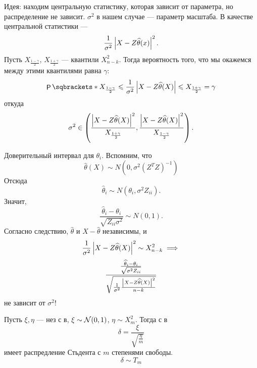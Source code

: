 Идея: находим центральную статистику, которая зависит от параметра, но распределение не зависит. \(\sigma^2\) в нашем случае --- параметр масштаба. В качестве центральной статистики --- 
\begin{displaymath}
    \frac{1}{\sigma^2} \left|X - Z \widehat{\theta}(x)\right|^2.
\end{displaymath}
Пусть \(X_{\frac{1 - \gamma}{2}}\), \(X_{\frac{1 + \gamma}{2}}\) --- квантили \(X^2_{n - k}\). Тогда вероятность того, что мы окажемся между этими квантилями равна \(\gamma\):
\begin{displaymath}
    \PP{X_{\frac{1 - \gamma}{2}} \leq \frac{1}{\sigma^2} \abs{X - Z \widehat\theta (X)} \leq X_{\frac{1 + \gamma}{2}}} = \gamma
\end{displaymath}
откуда
\begin{displaymath}
    \sigma^2 \in \left(\frac{\left|X - Z \widehat{\theta}(X)\right|^2}{X_{\frac{1 + \gamma}{2}}}, \frac{\left|X - Z \widehat{\theta}(X)\right|^2}{X_{\frac{1 - \gamma}{2}}}\right).
\end{displaymath}

Доверительный интервал для \(\theta_i\).
Вспомним, что
\begin{displaymath}
    \widehat{\theta}(X) \sim N(0, \sigma^2 (Z^T Z)^{-1})
\end{displaymath}
Отсюда
\begin{displaymath}
    \widehat{\theta}_i \sim N(\theta_i, \sigma^2 Z_{ii}).
\end{displaymath}
Значит,
\begin{displaymath}
    \frac{\widehat\theta_i - \theta_i}{\sqrt{Z_{ii} \sigma^2}} \sim N(0, 1).
\end{displaymath}
Согласно следствию, \(\widehat\theta\) и \(X - \widehat\theta\) независимы, и
\begin{displaymath}
    \frac{1}{\sigma^2} \left|X - Z \widehat{\theta}(X)\right|^2 \sim X^2_{n - k} \implies
\end{displaymath}
\begin{displaymath}
    \frac{\frac{\widehat\theta_i - \theta_i}{\sqrt{\sigma^2 Z_{ii}}}}{\sqrt{\frac{1}{\sigma^2} \frac{\left|X - Z \widehat\theta(X)\right|^2}{n - k}}}
\end{displaymath}
не зависит от \(\sigma^2\)!

\begin{definition}
    Пусть \(\xi, \eta\) --- нез с в, \(\xi \sim \mathcal{N}(0, 1)\), \(\eta \sim X^2_m\). Тогда с в 
    \begin{displaymath}
        \delta = \frac{\xi}{\sqrt{\frac{\eta}{m}}}
    \end{displaymath}
    имеет распредление Стьдента с \(m\) степенями свободы.
    \begin{displaymath}
        \delta \sim T_m
    \end{displaymath}
\end{definition}

